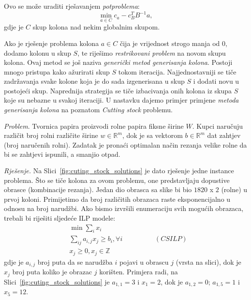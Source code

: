 \documentclass[a4paper, utf8, 11pt, colorlinks]{book}
\begin{document}
Ovo se može uraditi rješavanjem \emph{potproblema}:
$$\min_{a \in C} c_a - c_B^T B^{-1} a,$$
gdje je $C$ skup kolona nad nekim globalnim skupom. 

Ako je rješenje problema kolona $a \in C$ čija je vrijednost strogo manja od 0, dodamo kolonu u skup $S$, te riješimo \emph{restrikovani problem} na novom skupu kolona. Ovaj metod se još naziva \emph{generički metod generisanja kolona}.  
Postoji mnogo pristupa kako ažurirati skup $S$ tokom iteracija. 
Najjednostavniji se tiče zadržavanja svake kolone koja je do sada izgenerisana  u skup $S$ i dodati novu u postojeći skup. Naprednija strategija se tiče izbacivanja onih kolona iz skupa $S$ koje su nebazne u svakoj iteraciji. 
 U nastavku dajemo primjer primjene \emph{metoda generisanja kolona} na poznatom \emph{Cutting stock} problemu. 
 
 \emph{Problem}. Tvornica papira proizvodi rolne papira fiksne širine  $W$. 
 Kupci naručuju različit broj rolni različite širine $w \in \mathbb{R}^m$, dok je sa vektorom $b \in \mathbb{R}^m$ dat zahtjev (broj naručenih rolni).  Zadatak je pronaći optimalan način  rezanja velike rolne da bi se zahtjevi ispunili, a smanjio otpad.  
 
 \emph{Rješenje.} Na Slici~\ref{fig:cuting_stock_solutions} je dato rješenje jedne instance problema. 
 Što se tiče kolona za ovom problemu, one predstavljaju dopustive obrasce (kombinacije rezanja). Jedan dio obrasca sa slike bi bio $1820$ x $2$ (rolne) u prvoj koloni.
 Primijetimo da broj različitih obrazaca raste eksponencijalno u odnosu na broj narudžbi.  Ako bismo izvršili enumeraciju svih mogućih obrazaca, trebali bi riješiti sljedeće ILP modele:
 \begin{align*}
      & \min \sum_{i} x_i \\
      & \sum_{ij} a_{i,j }x_j \geq b_i, \forall i \hspace{2cm} (CSILP)\\
      &  x_j \geq 0, x_{j} \in \mathbb{Z} 
 \end{align*}
 gdje je $a_{i,j}$ broj puta da se narudžba $i$ pojavi u obrascu $j$ (vrsta na slici), dok  je $x_j$ broj puta koliko je obrazac $j$ korišten. Primjera radi, na  Slici~\ref{fig:cuting_stock_solutions} je $a_{1,1}=3$ i $x_1 = 2$, dok je $a_{1,2}=0$; $a_{1,5}=1$ i $ x_5 = 12$.
 
\end{document}
